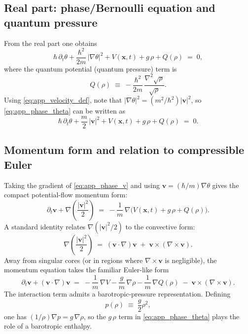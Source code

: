 \documentclass[11pt]{article}
\theoremstyle{plain}
\theoremstyle{definition}
\theoremstyle{remark}
\newcommand{\vfield}{\mathbf{v}}
\begin{document}
\subsection{Real part: phase/Bernoulli equation and quantum pressure}
From the real part one obtains
\begin{equation}\label{eq:app_phase_theta}
  \hbar\,\partial_t\theta
  + \frac{\hbar^2}{2m}\,|\nabla\theta|^2
  + V(\mathbf{x},t)
  + g\,\rho
  + Q(\rho)
  \;=\; 0,
\end{equation}
where the quantum potential (quantum pressure) term is
\begin{equation}\label{eq:app_quantum_potential}
  Q(\rho)
  \;\equiv\;
  -\frac{\hbar^2}{2m}\,\frac{\nabla^2\sqrt{\rho}}{\sqrt{\rho}}.
\end{equation}
Using \eqref{eq:app_velocity_def}, note that $|\nabla\theta|^2=(m^2/\hbar^2)|\vfield|^2$, so
\eqref{eq:app_phase_theta} can be written as
\begin{equation}\label{eq:app_phase_v}
  \hbar\,\partial_t\theta
  + \frac{m}{2}\,|\vfield|^2
  + V(\mathbf{x},t)
  + g\,\rho
  + Q(\rho)
  \;=\; 0.
\end{equation}

\subsection{Momentum form and relation to compressible Euler}
Taking the gradient of \eqref{eq:app_phase_v} and using $\vfield=(\hbar/m)\nabla\theta$ gives the
compact potential-flow momentum form:
\begin{equation}\label{eq:app_momentum_compact}
  \partial_t\vfield + \nabla\!\left(\frac{|\vfield|^2}{2}\right)
  \;=\;
  -\frac{1}{m}\,\nabla\!\Big(V(\mathbf{x},t) + g\,\rho + Q(\rho)\Big).
\end{equation}
A standard identity relates $\nabla(|\vfield|^2/2)$ to the convective form:
\begin{equation}\label{eq:app_identity_convective}
  \nabla\!\left(\frac{|\vfield|^2}{2}\right)
  \;=\;
  (\vfield\cdot\nabla)\vfield \;+\; \vfield\times(\nabla\times\vfield).
\end{equation}
Away from singular cores (or in regions where $\nabla\times\vfield$ is negligible), the momentum
equation takes the familiar Euler-like form
\begin{equation}\label{eq:app_euler_like}
  \partial_t\vfield + (\vfield\cdot\nabla)\vfield
  \;=\;
  -\frac{1}{m}\,\nabla V
  -\frac{g}{m}\,\nabla\rho
  -\frac{1}{m}\,\nabla Q(\rho)
  \;-\;
  \vfield\times(\nabla\times\vfield).
\end{equation}
The interaction term admits a barotropic-pressure representation. Defining
\begin{equation}\label{eq:app_pressure_barotropic}
  p(\rho) \;\equiv\; \frac{g}{2}\rho^2,
\end{equation}
one has $(1/\rho)\nabla p = g\,\nabla\rho$, so the $g\,\rho$ term in \eqref{eq:app_phase_theta} plays the
role of a barotropic enthalpy.
\end{document}
